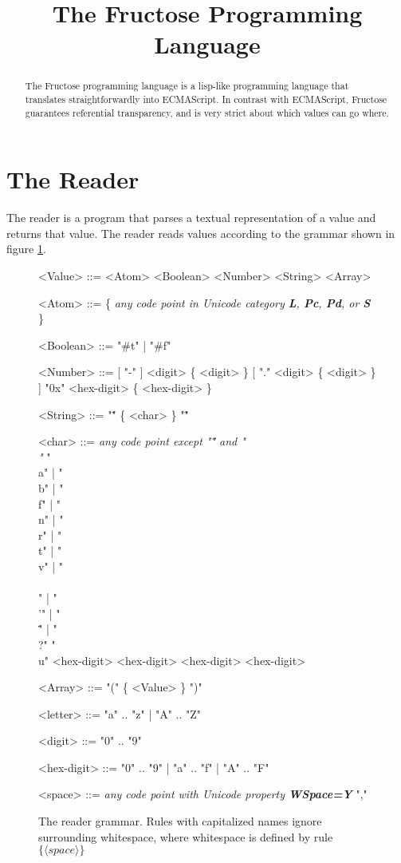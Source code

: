\documentclass[a4paper]{article}
\title{The Fructose Programming Language}
\begin{document}
\maketitle

\begin{abstract}
The Fructose programming language is a lisp-like programming language that translates straightforwardly into ECMAScript. In contrast with ECMAScript, Fructose guarantees referential transparency, and is very strict about which values can go where.
\end{abstract}

\section{The Reader}

The reader is a program that parses a textual representation of a value and returns that value. The reader reads values according to the grammar shown in figure \ref{fig:readergrammar}.

\begin{figure}[h]
\label{fig:readergrammar}
\caption{The reader grammar. Rules with capitalized names ignore surrounding whitespace, where whitespace is defined by rule $\{ \langle space \rangle \}$}
\begin{grammar}
<Value> ::= <Atom>
\alt <Boolean>
\alt <Number>
\alt <String>
\alt <Array>

<Atom> ::= \{ {\it any code point in Unicode category {\bf L}, {\bf Pc}, {\bf Pd}, or {\bf S}} \}

<Boolean> ::= "#t" | "#f"

<Number> ::= [ "-" ] <digit> \{ <digit> \} [ "." <digit> \{ <digit> \} ]
\alt "0x" <hex-digit> \{ <hex-digit> \}

<String> ::= "\"" \{ <char> \} "\""

<char> ::= {\it any code point except "\"" and "\\"}
\alt "\\a" | "\\b" | "\\f" | "\\n" | "\\r" | "\\t" | "\\v" | "\\\\" | "\\'" | "\\\"" | "\\?"
\alt "\\u" <hex-digit> <hex-digit> <hex-digit> <hex-digit>

<Array> ::= "(" \{ <Value> \} ")"

<letter> ::= "a" .. "z" | "A" .. "Z"

<digit> ::= "0" .. "9"

<hex-digit> ::= "0" .. "9" | "a" .. "f" | "A" .. "F"

<space> ::= {\it any code point with Unicode property {\bf WSpace=Y}}
\alt ","

\end{grammar}
\end{figure}
\end{document}
